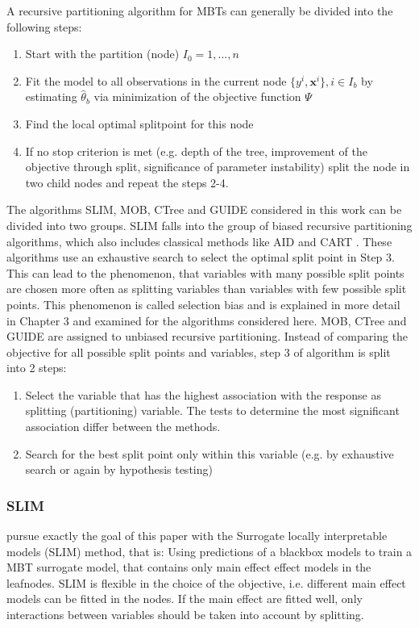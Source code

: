 A recursive partitioning algorithm for MBTs can generally be divided into the following steps:
\begin{enumerate}
    \item Start with the partition (node) $I_0 = 1,...,n$
    \item Fit the model to all observations in the current node $\{y^{i}, \mathbf{x}^{i}\}, i \in I_b$ by estimating $\hat{\theta}_b$ via minimization of the objective function $\Psi$
    \item Find the local optimal splitpoint for this node 
    \item If no stop criterion is met (e.g. depth of the tree, improvement of the objective through split, significance of parameter instability) split the node in two child nodes and repeat the steps 2-4.
\end{enumerate}


The algorithms SLIM, MOB, CTree and GUIDE considered in this work can be divided into two groups. SLIM falls into the group of biased recursive partitioning algorithms, which also includes classical methods like AID \citep{Morgan.1963} and CART \citep{Breiman.1984}. These algorithms use an exhaustive search to select the optimal split point in Step 3. This can lead to the phenomenon, that variables with many possible split points are chosen more often as splitting variables than variables with few possible split points. This phenomenon is called selection bias and is explained in more detail in Chapter 3 and examined for the algorithms considered here.
MOB, CTree and GUIDE are assigned to unbiased recursive partitioning. Instead of comparing the objective for all possible split points and variables, step 3 of algorithm is split into 2 steps:

\begin{enumerate}
    \item Select the variable that has the highest association with the response as splitting (partitioning) variable. The tests to determine the most significant association differ between the methods.
    \item Search for the best split point only within this variable (e.g. by exhaustive search or again by hypothesis testing)
\end{enumerate}

\citep{Schlosser.2019}



\subsubsection{SLIM}
\citep{Hu.2020} pursue exactly the goal of this paper with the Surrogate locally interpretable models (SLIM) method, that is: Using predictions of a blackbox models to train a MBT surrogate model, that contains only main effect effect models in the leafnodes. SLIM is flexible in the choice of the objective, i.e. different main effect models can be fitted in the nodes. If the main effect are fitted well, only interactions between variables should be taken into account by splitting. 

